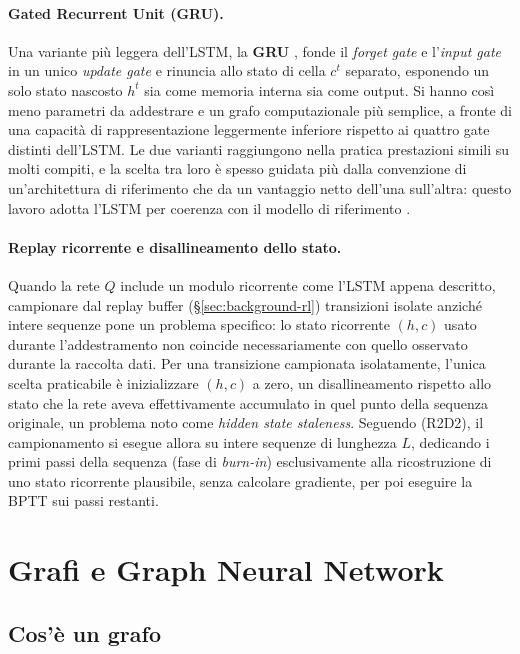 \paragraph{Gated Recurrent Unit (GRU).} Una variante più leggera dell'LSTM,
la \textbf{GRU} \citep{cho2014gru}, fonde il \emph{forget gate} e
l'\emph{input gate} in un unico \emph{update gate} e rinuncia allo stato di
cella $c^{t}$ separato, esponendo un solo stato nascosto $h^{t}$ sia
come memoria interna sia come output. Si hanno così meno parametri da addestrare e un
grafo computazionale più semplice, a fronte di una capacità di
rappresentazione leggermente inferiore rispetto ai quattro gate distinti
dell'LSTM. Le due varianti raggiungono nella pratica prestazioni simili su
molti compiti, e la scelta tra loro è spesso guidata più dalla
convenzione di un'architettura di riferimento che da un vantaggio netto
dell'una sull'altra: questo lavoro adotta l'LSTM per coerenza con il
modello di riferimento \citep{wang2022metastgat}.

\paragraph{Replay ricorrente e disallineamento dello stato.} Quando la
rete $Q$ include un modulo ricorrente come l'LSTM appena descritto,
campionare dal replay buffer (§\ref{sec:background-rl}) transizioni
isolate anziché intere sequenze pone un problema specifico: lo stato
ricorrente $(h,c)$ usato durante l'addestramento non coincide
necessariamente con quello osservato durante la raccolta dati. Per una
transizione campionata isolatamente, l'unica scelta praticabile è
inizializzare $(h,c)$ a zero, un disallineamento rispetto allo stato che
la rete aveva effettivamente accumulato in quel punto della sequenza
originale, un problema noto come \emph{hidden state staleness}. Seguendo
\citet{kapturowski2019r2d2} (R2D2), il campionamento si esegue allora su
intere sequenze di lunghezza $L$, dedicando i primi passi della sequenza
(fase di \emph{burn-in}) esclusivamente alla ricostruzione di uno stato
ricorrente plausibile, senza calcolare gradiente, per poi eseguire la
BPTT sui passi restanti.

\section{Grafi e Graph Neural Network}
\label{sec:background-gnn}

\subsection{Cos'è un grafo}

